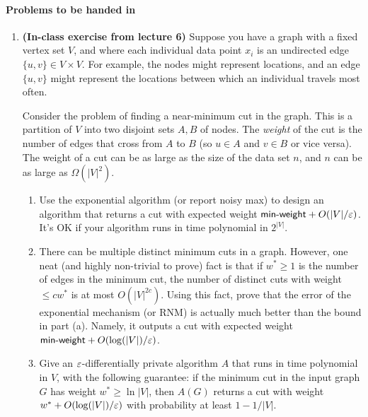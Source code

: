 \documentclass[11pt]{article}
\begin{document}
 \paragraph{Problems to be handed in}
\begin{enumerate}[leftmargin=\parindent, itemsep=3ex]
    \item \textbf{(In-class exercise from lecture 6)} Suppose you have a graph with a fixed vertex set $V$, and where
    each individual data point $x_i$ is an undirected edge $\{u,v\}\in V\times
    V$. For example, the nodes might represent locations, and an edge
    $\{u,v\}$ might represent the locations between which an individual
    travels most often.
  
    Consider the problem of finding a near-minimum cut in the graph. This
    is a partition of $V$ into two disjoint sets $A,B$ of nodes. The
    \emph{weight} of the cut is the number of edges that cross from $A$ to $B$
    (so $u\in A$ and $v\in B$ or vice versa).  The weight of a cut can be as large as the size of the data set $n$, and $n$ can be as large as $\Omega(|V|^2)$. 
    
    \begin{enumerate}
        \item Use the exponential algorithm (or report noisy max) to design an algorithm
        that returns a cut with expected weight $\text{\sf min-weight} +
        O(|V|/\varepsilon)$.  \\ It's OK if your algorithm runs in time polynomial in  $2^{|V|}$.
        
        \item There can be multiple distinct minimum cuts in a graph.  However, one neat (and highly non-trivial to prove) fact is that if $w^* \geq 1$ is the number of edges in the minimum cut, the number of distinct cuts with weight $\leq c w^*$ is at most $O(|V|^{2c})$.  Using this fact, prove that the error of the exponential mechanism (or RNM) is actually much better than the bound in part (a). Namely,  it outputs a cut with expected weight
        $
        \text{\sf min-weight} +
        O(\log(|V|)/\varepsilon)
        $.

        \item Give an $\varepsilon$-differentially private algorithm $A$ that runs in time polynomial in $V$, with the following guarantee: if the minimum cut in the input graph $G$ has weight $w^* \geq \ln |V|$, then $A(G)$ returns a cut with weight $w^*+
        O(\log(|V|)/\varepsilon)$ with probability at least $1-1/|V|$.


\end{enumerate}
\end{enumerate}
\end{document}
